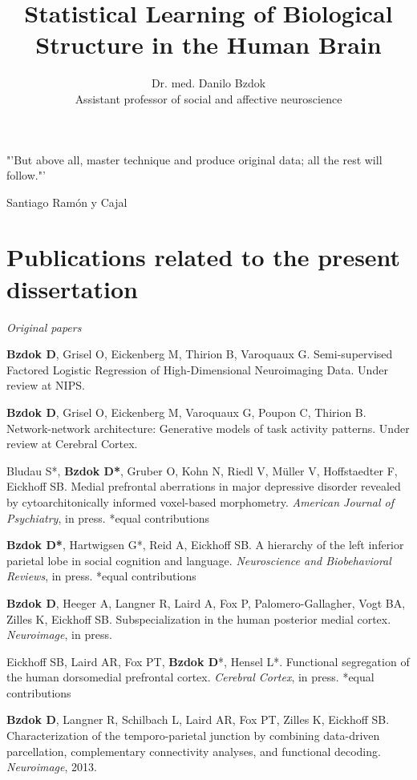 \documentclass[authoryear,review,3p]{elsarticle}
\begin{document}
  
\begin{frontmatter}

\title{Statistical Learning of Biological Structure in the Human Brain}

\author{Dr. med. Danilo Bzdok\\
Assistant professor of social and affective neuroscience}

\end{frontmatter}

"'But above all, master technique and produce original data; 
all the rest will follow."'

Santiago Ram\'{o}n y Cajal

\bigskip

\newpage
\section*{Publications related to the present dissertation}
\linebreak
\textit{Original papers}

\textbf{Bzdok D}, Grisel O, Eickenberg M, Thirion B, Varoquaux G.
Semi-supervised Factored Logistic Regression of High-Dimensional
Neuroimaging Data. Under review at NIPS.

\textbf{Bzdok D}, Grisel O, Eickenberg M, Varoquaux G, Poupon C, Thirion B.
Network-network architecture: Generative models of task activity patterns.
Under review at Cerebral Cortex.

Bludau S*, \textbf{Bzdok D*}, Gruber O,
Kohn N, Riedl V, Müller V, Hoffstaedter F, Eickhoff SB.
Medial prefrontal aberrations in major depressive disorder
revealed by cytoarchitonically informed voxel-based morphometry.
\textit{American Journal of Psychiatry}, in press. *equal contributions

\textbf{Bzdok D*}, Hartwigsen G*, Reid A, Eickhoff SB.
A hierarchy of the left inferior parietal lobe in social cognition and
language.
\textit{Neuroscience and Biobehavioral Reviews}, in press. *equal contributions

\textbf{Bzdok D}, Heeger A, Langner R, Laird A, Fox P, Palomero-Gallagher,
Vogt BA, Zilles K, Eickhoff SB.
Subspecialization in the human posterior medial cortex.
\textit{Neuroimage}, in press.

Eickhoff SB, Laird AR, Fox PT, \textbf{Bzdok D}*, Hensel L*.
Functional segregation of the human dorsomedial prefrontal cortex.
\textit{Cerebral Cortex}, in press. *equal contributions

\textbf{Bzdok D}, Langner R, Schilbach L, Laird AR, Fox PT, Zilles K, Eickhoff SB.
Characterization of the temporo-parietal junction by combining data-driven
parcellation, complementary connectivity analyses, and functional decoding.
\textit{Neuroimage}, 2013.
\end{document}
